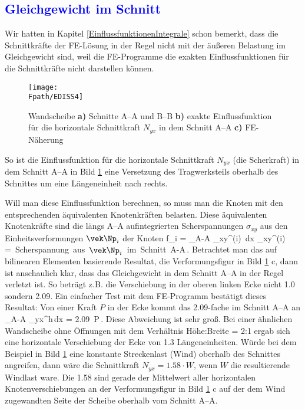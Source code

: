 {%
{\textcolor{blue}{\section{Gleichgewicht im Schnitt}}}\label{Gleichgewicht im Schnitt}
Wir hatten in Kapitel \ref{EinflussfunktionenIntegrale} schon bemerkt, dass die
Schnittkr\"{a}fte der FE-L\"{o}sung in der Regel nicht mit der \"{a}u{\ss}eren Belastung im
Gleichgewicht sind, weil die FE-Programme die exakten Einflussfunktionen f\"{u}r die
Schnittkr\"{a}fte nicht darstellen k\"{o}nnen.
\begin{figure}[tbp] \centering
\if {} \sidecaption \fi
\texttt{[image: \\Fpath/EDISS4]}
\caption{Wandscheibe {\bf a)} Schnitte A--A und B--B {\bf b)} exakte Einflussfunktion f\"{u}r die
horizontale Schnittkraft $N_{yx}$ in dem Schnitt A--A {\bf c)} FE-N\"{a}herung} \label{InfWand1}
\end{figure}%

So ist die Einflussfunktion f\"{u}r die horizontale Schnittkraft $N_{yx}$ (die Scherkraft)
in dem Schnitt A--A in Bild \ref{InfWand1} eine Versetzung des Tragwerksteils oberhalb
des Schnittes um eine L\"{a}ngeneinheit nach rechts.

Will man diese Einflussfunktion berechnen, so muss man die Knoten mit den entsprechenden
\"{a}quivalenten Knotenkr\"{a}ften belasten. Diese \"{a}quivalenten Knotenkr\"{a}fte sind die l\"{a}ngs A--A
aufintegrierten Scherspannungen $\sigma_{xy}$ aus den Einheitsverformungen $\vek \Np_i$ der Knoten
\bfoo
f_i = \int_{A-A} \sigma_{xy}^{(i)} \,dx \qquad \sigma_{xy}^{(i)} \mbox{= Scherspannung aus $\vek \Np_i$ im Schnitt A-A}\,.
\efoo
Betrachtet man das auf bilinearen Elementen basierende Resultat, die Verformungsfigur in
Bild \ref{InfWand1} c, dann ist anschaulich klar, dass das Gleichgewicht in dem Schnitt
A--A in der Regel verletzt ist. So betr\"{a}gt z.B. die Verschiebung in der oberen linken
Ecke nicht 1.0 sondern 2.09. Ein einfacher Test mit dem FE-Programm best\"{a}tigt dieses
Resultat: Von einer Kraft $P$ in der Ecke kommt das 2.09-fache im Schnitt A--A an
\bfoo
\int_{A-A} \sigma_{yx}^{h}\,dx = 2.09 \,P\,.
\efoo
Diese Abweichung ist sehr gro{\ss}. Bei einer \"{a}hnlichen Wandscheibe ohne \"{O}ffnungen mit dem
Verh\"{a}ltnis H\"{o}he:Breite = 2:1 ergab sich eine horizontale Verschiebung der Ecke von 1.3
L\"{a}ngeneinheiten. W\"{u}rde bei dem Beispiel in Bild \ref{InfWand1} eine konstante
Streckenlast (Wind) oberhalb des Schnittes angreifen, dann w\"{a}re die Schnittkraft $N_{yx}
= 1.58 \cdot W$, wenn $W$ die resultierende Windlast ware. Die 1.58 sind gerade der
Mittelwert aller horizontalen Knotenverschiebungen an der Verformungsfigur in Bild
\ref{InfWand1} c auf der dem Wind zugewandten Seite der Scheibe oberhalb vom Schnitt A--A.

}
